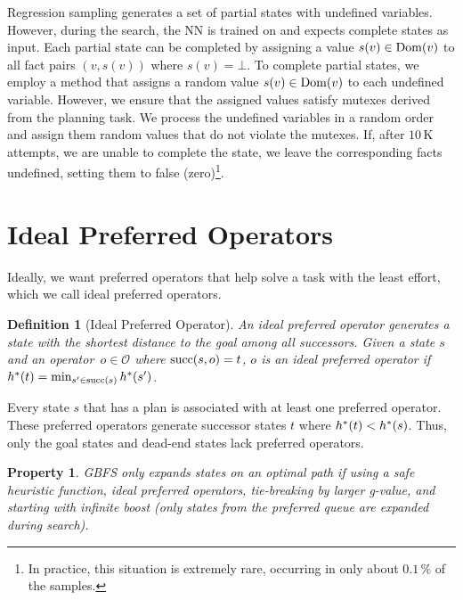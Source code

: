 \documentclass[ppgc,diss,english]{iiufrgs}
\newtheorem{definition}{Definition}
\newtheorem{property}{Property}
\begin{document}
Regression sampling generates a set of partial states with undefined variables. However, during the search, the NN is trained on and expects complete states as input.
Each partial state can be completed by assigning a value $s(v)\in\operatorname{Dom}(v)$ to all fact pairs $(v,s(v))$ where $s(v)=\bot$.
To complete partial states, we employ a method that assigns a random value $s(v) \in \operatorname{Dom}(v)$ to each undefined variable. However, we ensure that the assigned values satisfy mutexes derived from the planning task. We process the undefined variables in a random order and assign them random values that do not violate the mutexes. If, after $10$\,K attempts, we are unable to complete the state, we leave the corresponding facts undefined, setting them to false (zero)\footnote{In practice, this situation is extremely rare, occurring in only about $0.1\,\%$ of the samples.}.


\section{Ideal Preferred Operators}
\label{sec:sample-ideal-po}
Ideally, we want preferred operators that help solve a task with the least effort, which we call ideal preferred operators.

\begin{definition}[Ideal Preferred Operator]\label{def:ideal_preferred_operator}
  An ideal preferred operator generates a state with the shortest distance to the goal among all successors. Given a state $s$ and an operator~$o \in \mathcal{O}$ where $\operatorname{succ}(s,o) = t$, $o$ is an ideal preferred operator if $h^*({t}) = \min_{s' \in \operatorname{succ}(s)} h^*({s'})$.
\end{definition}

Every state $s$ that has a plan is associated with at least one preferred operator. These preferred operators generate successor states $t$ where $h^*({t}) < h^*({s})$. Thus, only the goal states and dead-end states lack preferred operators.

\begin{property}
  \label{prop:ideal-optimal}
  GBFS only expands states on an optimal path if using a safe heuristic function, ideal preferred operators, tie-breaking by larger g-value, and starting with infinite boost (only states from the preferred queue are expanded during search).
\end{property}
\end{document}
